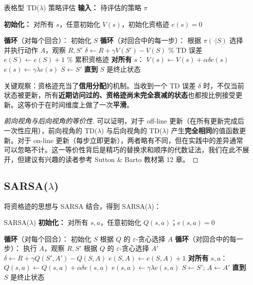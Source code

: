 \begin{myalgorithm}{表格型 TD($\lambda$) 策略评估}
\textbf{输入：} 待评估的策略 $\pi$

\textbf{初始化：} 对所有 $s$，任意初始化 $V(s)$，初始化资格迹 $e(s)=0$

\textbf{循环}（对每个回合）：
\quad 初始化 $S$
\quad \textbf{循环}（对回合中的每一步）：
\quad \quad 根据 $\pi(\cdot|S)$ 选择并执行动作 $A$，观察 $R, S'$
\quad \quad $\delta \leftarrow R + \gamma V(S') - V(S)$ \quad \color{gray} \% TD 误差
\quad \quad $e(S) \leftarrow e(S) + 1$ \quad \color{gray} \% 累积资格迹
\quad \quad \textbf{对所有} $s$：
\quad \quad \quad $V(s) \leftarrow V(s) + \alpha \delta e(s)$
\quad \quad \quad $e(s) \leftarrow \gamma \lambda e(s)$
\quad \quad $S \leftarrow S'$
\quad \textbf{直到} $S$ 是终止状态
\end{myalgorithm}

关键观察：资格迹充当了\textbf{信用分配}的机制。当收到一个 TD 误差 $\delta$ 时，不仅当前状态被更新，所有\textbf{近期访问过的、资格迹尚未完全衰减的状态}也都按比例接受更新。这等价于在时间维度上做了一次\textbf{平滑}。

\begin{proof}[前向视角与后向视角的等价性]
可以证明，对于 off-line 更新（在所有更新完成后一次性应用），前向视角的 TD($\lambda$) 与后向视角的 TD($\lambda$) 产生\textbf{完全相同}的值函数更新。对于 on-line 更新（每步立即更新），两者略有不同，但在实践中的差异通常可以忽略不计。这一等价性背后是精巧的替换求和顺序的代数证法，我们在此不展开，但建议有兴趣的读者参考 Sutton \& Barto 教材第 12 章。
\end{proof}

\subsection{SARSA($\lambda$)}

将资格迹的思想与 SARSA 结合，得到 SARSA($\lambda$)：

\begin{myalgorithm}{SARSA($\lambda$)}
\textbf{初始化：} 对所有 $s,a$，任意初始化 $Q(s,a)$；$e(s,a)=0$

\textbf{循环}（对每个回合）：
\quad 初始化 $S$
\quad 根据 $Q$ 的 $\varepsilon$-贪心选择 $A$
\quad \textbf{循环}（对回合中的每一步）：
\quad \quad 执行 $A$，观察 $R, S'$
\quad \quad 根据 $Q$ 的 $\varepsilon$-贪心选择 $A'$
\quad \quad $\delta \leftarrow R + \gamma Q(S', A') - Q(S,A)$
\quad \quad $e(S,A) \leftarrow e(S,A) + 1$
\quad \quad \textbf{对所有} $s, a$：
\quad \quad \quad $Q(s,a) \leftarrow Q(s,a) + \alpha \delta e(s,a)$
\quad \quad \quad $e(s,a) \leftarrow \gamma \lambda e(s,a)$
\quad \quad $S \leftarrow S'$; $A \leftarrow A'$
\quad \textbf{直到} $S$ 是终止状态
\end{myalgorithm}

